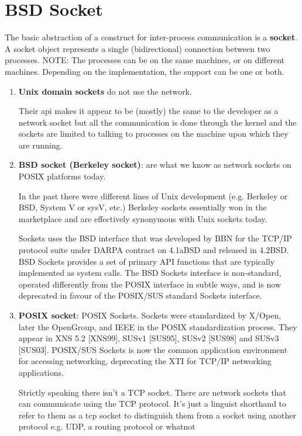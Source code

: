\chapter{BSD Socket}
\label{chap:Socket}

The basic abstraction of a construct for inter-process communication is a {\bf
socket}. A socket object represents a single (bidirectional) connection between
two processes. NOTE: The processes can be on the same machines, or on different
machines. Depending on the implementation, the support can be one or both.

\begin{enumerate}

  \item  {\bf Unix domain sockets} do not use the network. 
  \label{sec:socket-Unix-domain}
  
  Their api makes it appear to be (mostly) the same to the developer as a
  network socket but all the communication is done through the kernel and the
  sockets are limited to talking to processes on the machine upon which they are
  running.
  
  \item {\bf BSD socket (Berkeley socket)}:  are what we know as network sockets
  on POSIX platforms today.
  
  In the past there were different lines of Unix development (e.g. Berkeley or
  BSD, System V or sysV, etc.) Berkeley sockets essentially won in the
  marketplace and are effectively synonymous with Unix sockets today.

  Sockets uses the BSD interface that was developed by BBN for the TCP/IP
  protocol suite under DARPA contract on 4.1aBSD and released in 4.2BSD. BSD
  Sockets provides a set of primary API functions that are typically
   implemented as system calls. The BSD Sockets interface is non-standard,
   operated differently from the POSIX interface in subtle ways, and is now
   deprecated in favour of the POSIX/SUS standard Sockets interface.
  
  \item  {\bf POSIX socket}: POSIX Sockets. Sockets were standardized by X/Open,
   later the OpenGroup, and IEEE in the POSIX standardization process. They appear in
  XNS 5.2 [XNS99], SUSv1 [SUS95], SUSv2 [SUS98] and SUSv3 [SUS03]. POSIX/SUS
  Sockets is now the common application environment for accessing networking,
  deprecating the XTI for TCP/IP networking applications.

  Strictly speaking there isn't a TCP socket. There are network sockets that can
  communicate using the TCP protocol. It's just a linguist shorthand to refer to
  them as a tcp socket to distinguish them from a socket using another protocol
  e.g. UDP, a routing protocol or whatnot  
  

\end{enumerate}
